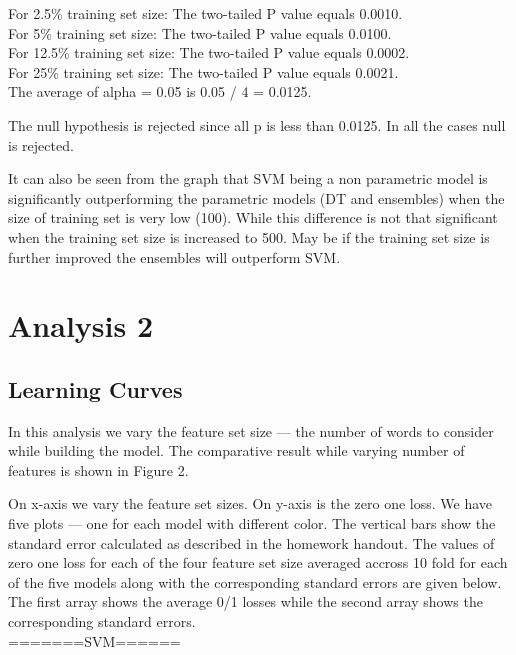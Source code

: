 \documentclass[12pt]{article}
\begin{document}
For 2.5\% training set size:
  The two-tailed P value equals 0.0010. \\

For 5\% training set size:
  The two-tailed P value equals 0.0100. \\

For 12.5\% training set size:
  The two-tailed P value equals 0.0002.  \\

For 25\% training set size:
  The two-tailed P value equals 0.0021.\\

The average of alpha = 0.05 is 0.05 / 4 = 0.0125.

The null hypothesis is rejected since all p is less than 0.0125. In all the cases null is rejected.

It can also be seen from the graph that SVM being a non parametric model is significantly outperforming
the parametric models (DT and ensembles) when the size of training set is very low (100). 
While this difference is not that significant when the training set size is increased to 500.
May be if the training set size is further improved the ensembles will outperform SVM.

\section{Analysis 2}

\subsection{Learning Curves}

In this analysis we vary the feature set size --- the number of words to consider while building
the model. The comparative result while varying number of features is shown in Figure 2.

 On x-axis we vary the feature set sizes. On y-axis is the zero one loss. 
We have five plots --- one for each model with different color. The vertical 
bars show the standard error calculated as described in the homework handout. The 
values of zero one loss for each of the four feature set size averaged accross 10 fold for 
each of the five models along with the corresponding standard errors are given below. The
first array shows the average 0/1 losses while the second array shows the corresponding 
standard errors.
\\

=======SVM======
\end{document}

